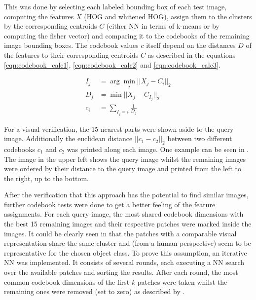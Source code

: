 This was done by selecting each labeled bounding box of each test image, computing the features $X$ (\ac{HOG} and whitened \ac{HOG}), assign them to the clusters by the corresponding centroids $C$ (either \ac{NN} in terms of k-means or by computing the fisher vector) and comparing it to the codebooks of the remaining image bounding boxes. The codebook values $c$ itself depend on the distances $D$ of the features to their corresponding centroids $C$ as described in the equations \ref{eqn:codebook_calc1}, \ref{eqn:codebook_calc2} and \ref{eqn:codebook_calc3}.

%	

\begin{align}
	I_j &= \arg \min_i ||X_j - C_i||_2
	    \label{eqn:codebook_calc1} \\
	D_j &= \min ||X_j - C_{I_j}||_2
	    \label{eqn:codebook_calc2} \\
	c_i &= \sum_{I_j = i} \frac{1}{D_j}
	\label{eqn:codebook_calc3}
\end{align}

For a visual verification, the 15 nearest parts were shown aside to the query image. Additionally the euclidean distance $||c_1-c_2||_2$ between two different codebooks $c_1$ and $c_2$ was printed along each image. One example can be seen in . The image in the upper left shows the query image whilst the remaining images were ordered by their distance to the query image and printed from the left to the right, up to the bottom.

After the verification that this approach has the potential to find similar images, further codebook tests were done to get a better feeling of the feature assignments.
For each query image, the most shared codebook dimensions with the best 15 remaining images and their respective patches were marked inside the images. It could be clearly seen in  that the patches with a comparable visual representation share the same cluster and (from a human perspective) seem to be representative for the chosen object class.
To prove this assumption, an iterative \ac{NN} was implemented. It consists of several rounds, each executing a \ac{NN} search over the available patches and sorting the results. After each round, the most common codebook dimensions of the first $k$ patches were taken whilst the remaining ones were removed (set to zero) as described by .

